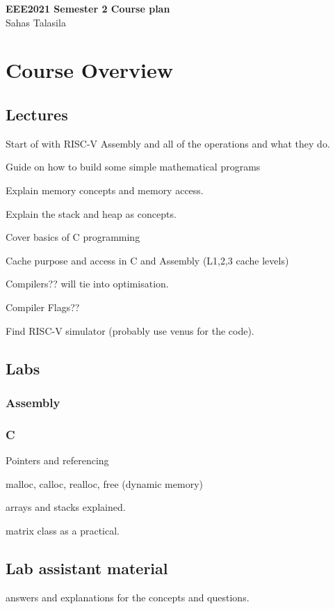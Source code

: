 \documentclass[a4paper,12pt]{article}
\date{}
\theoremstyle{definition}
\begin{document}
\onehalfspacing
\begin{titlepage}
    \centering
    \vspace*{2cm}
    \Huge{\textbf{EEE2021 Semester 2 Course plan}} \\[1.5cm]
    \Large{Sahas Talasila} \\[1cm]
    \vfill
\end{titlepage}

\tableofcontents
\newpage


\section{Course Overview}

\subsection{Lectures}

Start of with RISC-V Assembly and all of the operations and what they do.

Guide on how to build some simple mathematical programs

Explain memory concepts and memory access.

Explain the stack and heap as concepts.

Cover basics of C programming

Cache purpose and access in C and Assembly (L1,2,3 cache levels)

Compilers?? will tie into optimisation.

Compiler Flags??

Find RISC-V simulator (probably use venus for the code).

\subsection{Labs}

\subsubsection{Assembly}

\subsubsection{C}

Pointers and referencing

malloc, calloc, realloc, free (dynamic memory)

arrays and stacks explained. 

matrix class as a practical.

\subsection{Lab assistant material}

answers and explanations for the concepts and questions.
\end{document}
